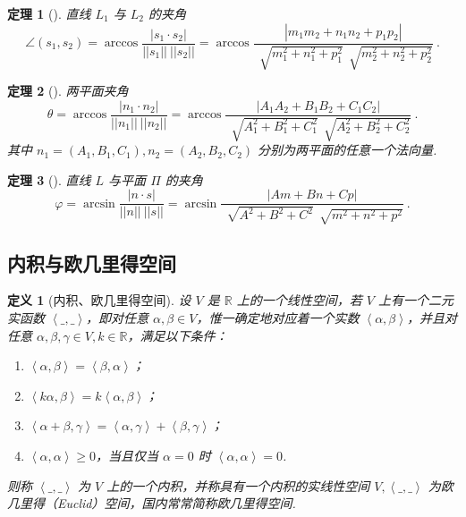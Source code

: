 \documentclass[zihao=-4,UTF8,linespread=1.8,nothm]{aytony_base}
\newtheorem{theorem}{\indent 定理}[subsection]
\newtheorem{definition}{\indent 定义}[subsection]
\begin{document}
\begin{theorem}[]
    直线 $L_1$ 与 $L_2$ 的夹角 $$
        \angle (s_1, s_2) = \arccos \dfrac{|s_1 \cdot s_2|}{||s_1||\ ||s_2||} = \arccos \dfrac{|m_1m_2 + n_1n_2 + p_1p_2|}{\,\sqrt[]{m_1^2 + n_1^2 + p_1^2}\,\sqrt[]{m_2^2 + n_2^2 + p_2^2}}\ .
    $$
\end{theorem}

\begin{theorem}[]
    两平面夹角 $$
        \theta = \arccos \dfrac{|n_1 \cdot n_2|}{||n_1||\ ||n_2||} = \arccos \dfrac{|A_1A_2+B_1B_2+C_1C_2|}{\,\sqrt[]{A_1^2+B_1^2+C_1^2}\,\sqrt[]{A_2^2+B_2^2+C_2^2}}\ .
    $$ 其中 $n_1 = (A_1,B_1,C_1), n_2 = (A_2,B_2,C_2)$ 分别为两平面的任意一个法向量.
\end{theorem}

\begin{theorem}[]
    直线 $L$ 与平面 $\Pi$ 的夹角 $$
        \varphi = \arcsin \dfrac{|n \cdot s|}{||n||\ ||s||} = \arcsin \dfrac{|Am+Bn+Cp|}{\,\sqrt[]{A^2+B^2+C^2} \,\sqrt[]{m^2+ n^2 + p^2}}\ .
    $$
\end{theorem}

\subsection{内积与欧几里得空间}

\begin{definition}[内积、欧几里得空间]

    设 $V$ 是 $\mathbb{R}$ 上的一个线性空间，若 $V$ 上有一个二元实函数 $\left<\_,\_\right>$，即对任意 $\alpha,\beta \in V$，惟一确定地对应着一个实数 $\left<\alpha, \beta\right>$，并且对任意 $\alpha, \beta, \gamma \in V, k \in \mathbb{R}$，满足以下条件：

    \begin{enumerate}[nosep]
        \item $\left<\alpha, \beta\right> = \left<\beta, \alpha\right>$；
        \item $\left<k \alpha, \beta\right> = k\left<\alpha, \beta\right>$；
        \item $\left<\alpha+ \beta, \gamma\right> = \left<\alpha, \gamma\right> + \left<\beta, \gamma\right>$；
        \item $\left<\alpha, \alpha\right> \geqslant 0$，当且仅当 $\alpha = 0$ 时 $\left<\alpha, \alpha\right> = 0$.
    \end{enumerate}

    则称 $\left<\_,\_\right>$ 为 $V$ 上的一个内积，并称具有一个内积的实线性空间 $V, \left<\_,\_\right>$ 为欧几里得（Euclid）空间，国内常常简称欧几里得空间.
\end{definition}
\end{document}
